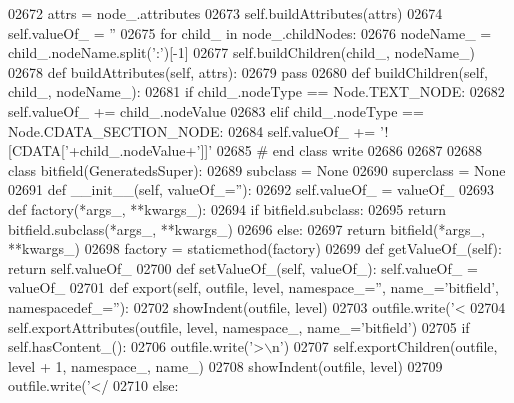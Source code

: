 \begin{DoxyCode}
{{{{{{{{{{{{{{{{{{{{{{{{{{{{{{{{{{{{{{{{{{{{{{{{{{{{{{{{{{{{{{{{{{{{{{{{{{{{{{{{{{{{{{{{{{{{{{{{{{{{{{{{{{{{{{{{{{{{{{{{{{{{{{{{{{{{{{{{{{{{{{{{{{{{{{{{{{{{{{{{{{{{{{{{{{{{{{{{{{{{{{{{{{{{{{02672         attrs = node\_.attributes
02673         self.buildAttributes(attrs)
02674         self.valueOf_ = \textcolor{stringliteral}{''}
02675         \textcolor{keywordflow}{for} child\_ \textcolor{keywordflow}{in} node\_.childNodes:
02676             nodeName\_ = child\_.nodeName.split(\textcolor{stringliteral}{':'})[-1]
02677             self.buildChildren(child\_, nodeName\_)
02678     \textcolor{keyword}{def }buildAttributes(self, attrs):
02679         \textcolor{keywordflow}{pass}
02680     \textcolor{keyword}{def }buildChildren(self, child\_, nodeName\_):
02681         \textcolor{keywordflow}{if} child\_.nodeType == Node.TEXT\_NODE:
02682             self.valueOf\_ += child\_.nodeValue
02683         \textcolor{keywordflow}{elif} child\_.nodeType == Node.CDATA\_SECTION\_NODE:
02684             self.valueOf\_ += \textcolor{stringliteral}{'![CDATA['}+child\_.nodeValue+\textcolor{stringliteral}{']]'}
02685 \textcolor{comment}{# end class write}
02686 
02687 
02688 \textcolor{keyword}{class }bitfield(GeneratedsSuper):
02689     subclass = \textcolor{keywordtype}{None}
02690     superclass = \textcolor{keywordtype}{None}
02691     \textcolor{keyword}{def }__init__(self, valueOf\_=''):
02692         self.valueOf_ = valueOf\_
02693     \textcolor{keyword}{def }factory(*args\_, **kwargs\_):
02694         \textcolor{keywordflow}{if} bitfield.subclass:
02695             \textcolor{keywordflow}{return} bitfield.subclass(*args\_, **kwargs\_)
02696         \textcolor{keywordflow}{else}:
02697             \textcolor{keywordflow}{return} bitfield(*args\_, **kwargs\_)
02698     factory = staticmethod(factory)
02699     \textcolor{keyword}{def }getValueOf_(self): \textcolor{keywordflow}{return} self.valueOf\_
02700     \textcolor{keyword}{def }setValueOf_(self, valueOf\_): self.valueOf\_ = valueOf\_
02701     \textcolor{keyword}{def }export(self, outfile, level, namespace\_='', name\_='bitfield', namespacedef\_=''):
02702         showIndent(outfile, level)
02703         outfile.write(\textcolor{stringliteral}{'<%
02704         self.exportAttributes(outfile, level, namespace\_, name\_=\textcolor{stringliteral}{'bitfield'})
02705         \textcolor{keywordflow}{if} self.hasContent_():
02706             outfile.write(\textcolor{stringliteral}{'>\(\backslash\)n'})
02707             self.exportChildren(outfile, level + 1, namespace\_, name\_)
02708             showIndent(outfile, level)
02709             outfile.write(\textcolor{stringliteral}{'</%
02710         \textcolor{keywordflow}{else}:
}}}}}}}}}}}}}}}}}}}}}}}}}}}}}}}}}}}}}}}}}}}}}}}}}}}}}}}}}}}}}}}}}}}}}}}}}}}}}}}}}}}}}}}}}}}}}}}}}}}}}}}}}}}}}}}}}}}}}}}}}}}}}}}}}}}}}}}}}}}}}}}}}}}}}}}}}}}}}}}}}}}}}}}}}}}}}}}}}}}}}}}}}}}}}}}}
\end{DoxyCode}
